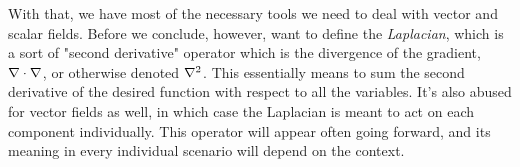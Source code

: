With that, we have most of the necessary tools we need to deal with vector and scalar fields. Before we conclude, however, want to define the \textit{Laplacian}, which is a sort of "second derivative" operator which is the divergence of the gradient, $\div \grad$, or otherwise denoted $\laplacian$. This essentially means to sum the second derivative of the desired function with respect to all the variables. It's also abused for vector fields as well, in which case the Laplacian is meant to act on each component individually. This operator will appear often going forward, and its meaning in every individual scenario will depend on the context. 

